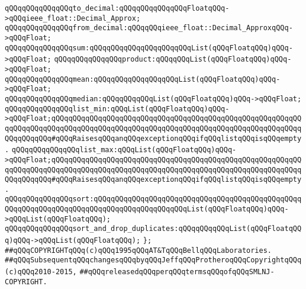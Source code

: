 \newline
\verb|qQQqqQQqqQQqqQQqto_decimal:qQQqqQQqqQQqqQQqFloatqQQq->qQQqieee_float::Decimal_Approx;|\newline
\verb|qQQqqQQqqQQqqQQqfrom_decimal:qQQqqQQqieee_float::Decimal_ApproxqQQq->qQQqFloat;|\newline
\newline
\verb|qQQqqQQqqQQqqQQqsum:qQQqqQQqqQQqqQQqqQQqqQQqList(qQQqFloatqQQq)qQQq->qQQqFloat;|\newline
\verb|qQQqqQQqqQQqqQQqproduct:qQQqqQQqList(qQQqFloatqQQq)qQQq->qQQqFloat;|\newline
\newline
\verb|qQQqqQQqqQQqqQQqmean:qQQqqQQqqQQqqQQqqQQqList(qQQqFloatqQQq)qQQq->qQQqFloat;|\newline
\verb|qQQqqQQqqQQqqQQqmedian:qQQqqQQqqQQqList(qQQqFloatqQQq)qQQq->qQQqFloat;|\newline
\newline
\verb|qQQqqQQqqQQqqQQqlist_min:qQQqList(qQQqFloatqQQq)qQQq->qQQqFloat;qQQqqQQqqQQqqQQqqQQqqQQqqQQqqQQqqQQqqQQqqQQqqQQqqQQqqQQqqQQqqQQqqQQqqQQqqQQqqQQqqQQqqQQqqQQqqQQqqQQqqQQqqQQqqQQqqQQqqQQqqQQqqQQqqQQqqQQqqQQq#qQQqRaisesqQQqanqQQqexceptionqQQqifqQQqlistqQQqisqQQqempty.|\newline
\verb|qQQqqQQqqQQqqQQqlist_max:qQQqList(qQQqFloatqQQq)qQQq->qQQqFloat;qQQqqQQqqQQqqQQqqQQqqQQqqQQqqQQqqQQqqQQqqQQqqQQqqQQqqQQqqQQqqQQqqQQqqQQqqQQqqQQqqQQqqQQqqQQqqQQqqQQqqQQqqQQqqQQqqQQqqQQqqQQqqQQqqQQqqQQqqQQq#qQQqRaisesqQQqanqQQqexceptionqQQqifqQQqlistqQQqisqQQqempty.|\newline
\newline
\verb|qQQqqQQqqQQqqQQqsort:qQQqqQQqqQQqqQQqqQQqqQQqqQQqqQQqqQQqqQQqqQQqqQQqqQQqqQQqqQQqqQQqqQQqqQQqqQQqqQQqqQQqqQQqqQQqList(qQQqFloatqQQq)qQQq->qQQqList(qQQqFloatqQQq);|\newline
\verb|qQQqqQQqqQQqqQQqsort_and_drop_duplicates:qQQqqQQqqQQqList(qQQqFloatqQQq)qQQq->qQQqList(qQQqFloatqQQq);|\newline
\verb|};|\newline
\newline
\newline
\newline
\verb|##qQQqCOPYRIGHTqQQq(c)qQQq1995qQQqAT&TqQQqBellqQQqLaboratories.|\newline
\verb|##qQQqSubsequentqQQqchangesqQQqbyqQQqJeffqQQqProtheroqQQqCopyrightqQQq(c)qQQq2010-2015,|\newline
\verb|##qQQqreleasedqQQqperqQQqtermsqQQqofqQQqSMLNJ-COPYRIGHT.|\newline

